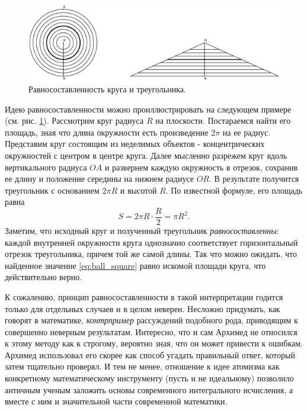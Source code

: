 \begin{figure}[t]
   \centering
   \includegraphics[scale=0.44]{images/archimed_1}
   \caption{Равносоставленность круга и треугольника.}
   \label{fig:archimed_1}
\end{figure}

Идею равносоставленности можно проиллюстрировать на следующем примере (см. рис. \ref{fig:archimed_1}).
Рассмотрим круг радиуса $R$ на плоскости.
Постараемся найти его площадь, зная что длина окружности есть произведение $2\pi$ на ее радиус.
Представим круг состоящим из неделимых объектов - концентрических окружностей с центром в центре круга.
Далее мысленно разрежем круг вдоль вертикального радиуса $OA$ и развернем каждую окружность в отрезок, сохранив ее длину и положение середины на нижнем радиусе $OR$.
В результате получится треугольник с основанием $2\pi R$ и высотой $R$.
По известной формуле, его площадь равна
\begin{equation}\label{eq:ball_square}
S = 2\pi R\cdot\frac{R}{2} = \pi R^2.
\end{equation}
Заметим, что исходный круг и полученный треугольник \textit{равносоставленны}: каждой внутренней окружности круга однозначно соответствует горизонтальный отрезок треугольника, причем той же самой длины.
Так что можно ожидать, что найденное значение \ref{eq:ball_square} равно искомой площади круга, что действительно верно.

К сожалению, принцип равносоставленности в такой интерпретации годится только для отдельных случаев и в целом неверен. 
Несложно придумать, как говорят в математике, \textit{контрпример} рассуждений подобного рода, приводящим к совершенно неверным результатам.
Интересно, что и сам Архимед не относился к этому методу как к строгому, вероятно зная, что он может привести к ошибкам.
Архимед использовал его скорее как способ угадать правильный ответ, который затем тщательно проверял.
И тем не менее, отношение к идее атомизма как конкретному математическому инструменту (пусть и не идеальному) позволило античным ученым заложить основы современного интегрального исчисления, а вместе с ним и значительной части современной математики.

